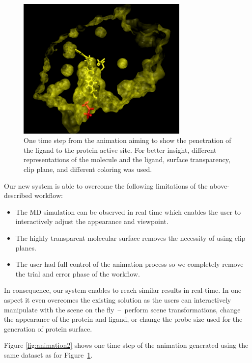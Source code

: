 \begin{figure}[htb]
  \centering
  \includegraphics[width=3.3in]{image/animation.png}
  \caption{One time step from the animation aiming to show the penetration of the ligand to the protein active site. For better insight, different representations of the molecule and the ligand, surface transparency, clip plane, and different coloring was used.}
	\label{fig:animation}
\end{figure}

Our new system is able to overcome the following limitations of the above-described workflow:
\begin{itemize} 
\item The MD simulation can be observed in real time which enables the user to interactively adjust the appearance and viewpoint.
\item The highly transparent molecular surface removes the necessity of using clip planes.
\item The user had full control of the animation process so we completely remove the trial and error phase of the workflow. 
\end{itemize}

In consequence, our system enables to reach similar results in real-time. 
In one aspect it even overcomes the existing solution as the users can interactively manipulate with the scene on the fly~--~perform scene transformations, change the appearance of the protein and ligand, or change the probe size used for the generation of protein surface.

Figure \ref{fig:animation2} shows one time step of the animation generated using the same dataset as for Figure~\ref{fig:animation}.

